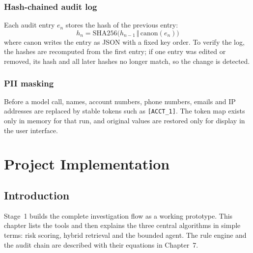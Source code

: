 \documentclass[oneside,a4paper,12pt]{report}
\begin{document}
\subsection{Hash-chained audit log}
Each audit entry $e_n$ stores the hash of the previous entry:
\begin{equation}
  h_n = \mathrm{SHA256}\bigl(h_{n-1} \,\Vert\, \mathrm{canon}(e_n)\bigr)
\end{equation}
where $\mathrm{canon}$ writes the entry as JSON with a fixed key order. To verify the log, the hashes are recomputed from the first entry; if one entry was edited or removed, its hash and all later hashes no longer match, so the change is detected.

\subsection{PII masking}
Before a model call, names, account numbers, phone numbers, emails and IP addresses are replaced by stable tokens such as \texttt{[ACCT\_1]}. The token map exists only in memory for that run, and original values are restored only for display in the user interface.

\chapter{Project Implementation}

\section{Introduction}
Stage~1 builds the complete investigation flow as a working prototype. This chapter lists the tools and then explains the three central algorithms in simple terms: risk scoring, hybrid retrieval and the bounded agent. The rule engine and the audit chain are described with their equations in Chapter~7.
\end{document}
